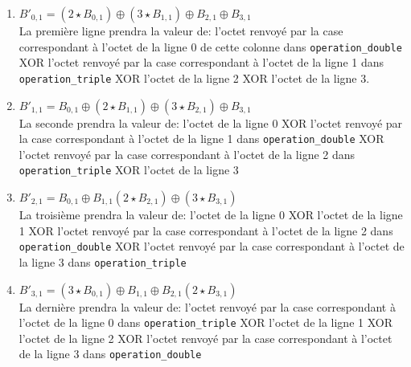 \documentclass[french, 12pt]{article}
\begin{document}
	\begin{enumerate}
		\vspace{0.5cm}
		\item \hspace{2cm}
		\begin{math}
			B'_{0,1} = (2 \star B_{0,1}) \oplus (3 \star B_{1,1}) \oplus B_{2,1} \oplus B_{3,1}
		\end{math} \\
		La première ligne prendra la valeur de: l'octet renvoyé par la case correspondant à l'octet de la ligne 0 de cette colonne dans \verb|operation_double| XOR l'octet renvoyé par la case correspondant à l'octet de la ligne 1 dans \verb|operation_triple| XOR l'octet de la ligne 2 XOR l'octet de la ligne 3.
		\vspace{0.5cm}
		\item \hspace{2cm}
		\begin{math}
			B'_{1,1} = B_{0,1} \oplus (2 \star B_{1,1}) \oplus (3 \star B_{2,1}) \oplus B_{3,1}
		\end{math} \\
		La seconde prendra la valeur de: l'octet de la ligne 0 XOR  l'octet renvoyé par la case correspondant à l'octet de la ligne 1 dans \verb|operation_double| XOR l'octet renvoyé par la case correspondant à l'octet de la ligne 2 dans \verb|operation_triple| XOR l'octet de la ligne 3
		\vspace{0.5cm}
		\item \hspace{2cm}
		\begin{math}
			B'_{2,1} = B_{0,1} \oplus B_{1,1} (2 \star B_{2,1}) \oplus (3 \star B_{3,1})
		\end{math} \\
		La troisième prendra la valeur de: l'octet de la ligne 0 XOR l'octet de la ligne 1 XOR  l'octet renvoyé par la case correspondant à l'octet de la ligne 2 dans \verb|operation_double| XOR l'octet renvoyé par la case correspondant à l'octet de la ligne 3 dans \verb|operation_triple| 
		\vspace{0.5cm}
		\item \hspace{2cm}
		\begin{math}
			B'_{3,1} = (3 \star B_{0,1}) \oplus B_{1,1} \oplus B_{2,1} (2 \star B_{3,1})
		\end{math} \\
		La dernière prendra la valeur de: l'octet renvoyé par la case correspondant à l'octet de la ligne 0 dans \verb|operation_triple| XOR l'octet de la ligne 1 XOR l'octet de la ligne 2 XOR  l'octet renvoyé par la case correspondant à l'octet de la ligne 3 dans \verb|operation_double|
	\end{enumerate}
\end{document}

